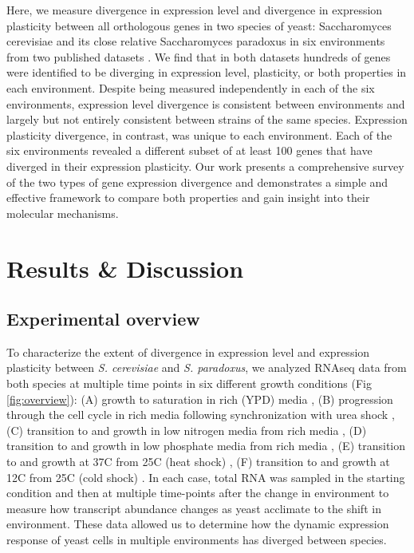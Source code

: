 Here, we measure divergence in expression level and divergence in expression plasticity between all orthologous genes in two species of yeast: Saccharomyces cerevisiae and its close relative Saccharomyces paradoxus in six environments from two published datasets \cite{Krieger2020, Fay2023}. We find that in both datasets hundreds of genes were identified to be diverging in expression level, plasticity, or both properties in each environment. Despite being measured independently in each of the six environments, expression level divergence is consistent between environments and largely but not entirely consistent between strains of the same species. Expression plasticity divergence, in contrast, was unique to each environment. Each of the six environments revealed a different subset of at least 100 genes that have diverged in their expression plasticity. Our work presents a comprehensive survey of the two types of gene expression divergence and demonstrates a simple and effective framework to compare both properties and gain insight into their molecular mechanisms.

\section{Results \& Discussion}

\subsection{Experimental overview}

To characterize the extent of divergence in expression level and expression plasticity between \textit{S. cerevisiae} and \textit{S. paradoxus}, we analyzed RNAseq data from both species at multiple time points in six different growth conditions (Fig \ref{fig:overview}): (A) growth to saturation in rich (YPD) media \cite{Krieger2020}, (B) progression through the cell cycle in rich media following synchronization with urea shock \cite{Lupo2021}, (C) transition to and growth in low nitrogen media from rich media \cite{Krieger2020}, (D) transition to and growth in low phosphate media from rich media \cite{Krieger2020}, (E) transition to and growth at 37C from 25C (heat shock) \cite{Fay2023}, (F) transition to and growth at 12C from 25C (cold shock) \cite{Fay2023}. In each case, total RNA was sampled in the starting condition and then at multiple time-points after the change in environment to measure how transcript abundance changes as yeast acclimate to the shift in environment. These data allowed us to determine how the dynamic expression response of yeast cells in multiple environments has diverged between species.


